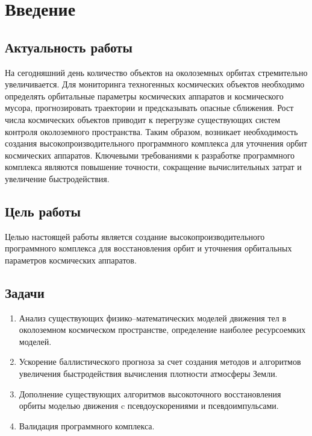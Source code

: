 \section{Введение}

\label{sec:Chapter0} 

\subsection*{Актуальность работы}

На сегодняшний день количество объектов на околоземных орбитах стремительно увеличивается.
Для мониторинга техногенных космических объектов необходимо
определять орбитальные параметры космических аппаратов и космического мусора,
прогнозировать траектории и предсказывать опасные сближения.
Рост числа космических объектов приводит к перегрузке существующих систем 
контроля околоземного пространства.
Таким образом, возникает необходимость создания высокопроизводительного программного 
комплекса для уточнения орбит космических аппаратов. 
Ключевыми требованиями к разработке программного 
комплекса являются повышение точности, 
сокращение вычислительных затрат и увеличение быстродействия.

\subsection*{Цель работы}

Целью настоящей работы является создание высокопроизводительного 
программного комплекса для восстановления орбит и уточнения орбитальных параметров 
космических аппаратов.

\subsection*{Задачи}

\begin{enumerate}
    \item Анализ существующих физико--математических моделей движения тел 
    в околоземном космическом пространстве, определение наиболее ресурсоемких моделей.
    \item Ускорение баллистического прогноза за счет создания методов и алгоритмов 
    увеличения быстродействия вычисления плотности атмосферы Земли.
    \item Дополнение существующих алгоритмов высокоточного восстановления орбиты моделью 
    движения c псевдоускорениями и псевдоимпульсами.
    \item Валидация программного комплекса.
\end{enumerate}


